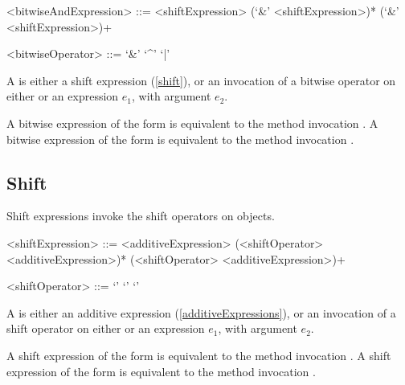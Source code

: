 \documentclass[makeidx]{article}
\begin{document}
{\begin{grammar}
<bitwiseAndExpression> ::= <shiftExpression> (`\&' <shiftExpression>)*
  \alt \SUPER{} (`\&' <shiftExpression>)+

<bitwiseOperator> ::= `\&'
  \alt `^'
  \alt `|'
\end{grammar}

\LMHash{}%
A  is either a shift expression (\ref{shift}),
or an invocation of a bitwise operator
on either \SUPER{} or an expression $e_1$,
with argument $e_2$.

\LMHash{}%
A bitwise expression of the form 
is equivalent to the method invocation .
A bitwise expression of the form 
is equivalent to the method invocation .



\subsection{Shift}

\LMHash{}%
Shift expressions invoke the shift operators on objects.

\begin{grammar}
<shiftExpression> ::= \gnewline{}
  <additiveExpression> (<shiftOperator> <additiveExpression>)*
  \alt \SUPER{} (<shiftOperator> <additiveExpression>)+

<shiftOperator> ::= `\ltlt'
  \alt `\gtgtgt'
  \alt `\gtgt'
\end{grammar}

\LMHash{}%
A  is either an additive expression
(\ref{additiveExpressions}),
or an invocation of a shift operator
on either \SUPER{} or an expression $e_1$,
with argument $e_2$.

\LMHash{}%
A shift expression of the form 
is equivalent to the method invocation .
A shift expression of the form 
is equivalent to the method invocation .



}
\end{document}

